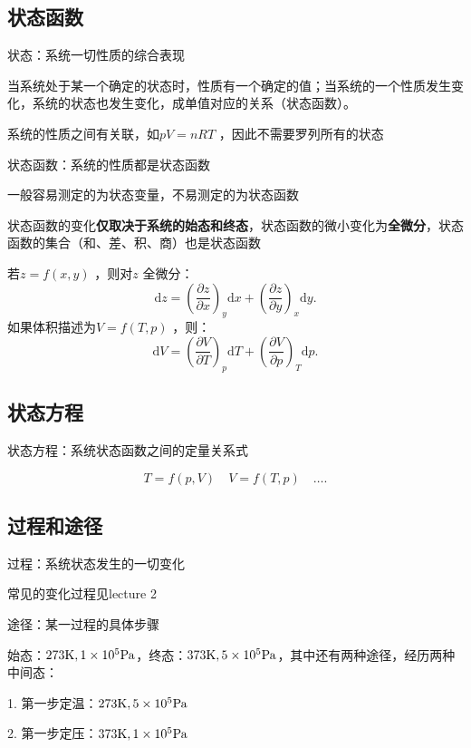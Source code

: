 \subsection{状态函数}%
\label{sub:状态函数}
\begin{defi}
    状态：系统一切性质的综合表现
\end{defi}
当系统处于某一个确定的状态时，性质有一个确定的值；当系统的一个性质发生变化，系统的状态也发生变化，成单值对应的关系（状态函数）。

系统的性质之间有关联，如$pV=nRT $ ，因此不需要罗列所有的状态

\begin{defi}
    状态函数：系统的性质都是状态函数
\end{defi}
一般容易测定的为状态变量，不易测定的为状态函数
\begin{notation}
    状态函数的变化\textbf{仅取决于系统的始态和终态}，状态函数的微小变化为\textbf{全微分}，状态函数的集合（和、差、积、商）也是状态函数
\end{notation}
\begin{eg}
    若$z=f\left( x,y \right)$ ，则对$z$ 全微分：\[
        \mathrm{d}z = \left(\frac{\partial z}{\partial x}\right)_{y}\mathrm{d}x + \left(\frac{\partial z}{\partial y}\right)_{x}\mathrm{d}y
    .\]
    如果体积描述为$V=f\left( T,p \right)$ ，则：\[
        \mathrm{d}V = \left(\frac{\partial V}{\partial T}\right)_{p}\mathrm{d}T + \left(\frac{\partial V}{\partial p}\right)_{T}\mathrm{d}p
    .\]
\end{eg}
\subsection{状态方程}%
\label{sub:状态方程}
\begin{defi}
    状态方程：系统状态函数之间的定量关系式
\end{defi}
\begin{eg}
     \[
        T = f\left( p,V \right)\quad V = f\left( T,p \right)\quad \ldots 
    .\]
\end{eg}
\subsection{过程和途径}%
\label{sub:过程和途径}
\begin{defi}
    过程：系统状态发生的一切变化
\end{defi}
常见的变化过程见lecture 2
\begin{defi}
    途径：某一过程的具体步骤
\end{defi}
\begin{eg}
    始态：$273\ce{K}, 1\times 10^{5}\ce{Pa}$，终态：$373\ce{K}, 5\times 10^{5}\ce{Pa}$，其中还有两种途径，经历两种中间态：

    1. 第一步定温：$273\ce{K}, 5\times 10^{5}\ce{Pa}$ 

    2. 第一步定压：$373\ce{K}, 1\times 10^{5}\ce{Pa}$
\end{eg}
